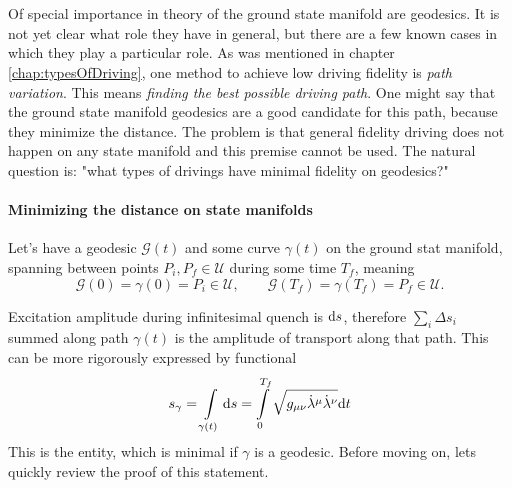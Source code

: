 \chapter{}
\label{chap:groundStateManifoldDriving}
Of special importance in theory of the ground state manifold are geodesics. It is not yet clear what role they have in general, but there are a few known cases in which they play a particular role. As was mentioned in chapter \ref{chap:typesOfDriving}, one method to achieve low driving fidelity is \emph{path variation}. This means \emph{finding the best possible driving path}. One might say that the ground state manifold geodesics are a good candidate for this path, because they minimize the distance. The problem is that general fidelity driving does not happen on any state manifold and this premise cannot be used. The natural question is: "what types of drivings have minimal fidelity on geodesics?"


\subsubsection{Minimizing the distance on state manifolds}
Let's have a geodesic $\mathcal{G}(t)$ and some curve $\gamma(t)$ on the ground stat manifold, spanning between points $P_i,P_f\in \mathcal U$ during some time $T_f$, meaning
 $$\mathcal{G}(0)=\gamma(0)=P_i\in\mathcal U,\qquad \mathcal{G}(T_f)=\gamma(T_f)=P_f\in\mathcal U.$$

Excitation amplitude during infinitesimal quench is $\mathrm{d} s$, therefore $\sum_i \Delta s_i$ summed along path $\gamma(t)$ is the amplitude of transport along that path. This can be more rigorously expressed by functional
\begin{equation}
    s_\gamma=\int\limits_{\gamma(t)}\mathrm{d} s=\int\limits_{0}^{T_f}\sqrt{g_{\mu\nu}\dot\lambda^\mu\dot\lambda^\nu}\mathrm{d} t
\end{equation}
This is the entity, which is minimal if $\gamma$ is a geodesic. Before moving on, lets quickly review the proof of this statement.

